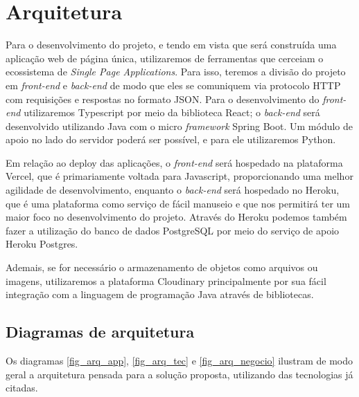 \section{Arquitetura}
Para o desenvolvimento do projeto, e tendo em vista que será construída uma aplicação web de página única, utilizaremos de ferramentas que cerceiam o ecossistema de \textit{Single Page Applications}. Para isso, teremos a divisão do projeto em \textit{front-end} e \textit{back-end} de modo que eles se comuniquem via protocolo HTTP com requisições e respostas no formato JSON. Para o desenvolvimento do \textit{front-end} utilizaremos Typescript por meio da biblioteca React; o \textit{back-end} será desenvolvido utilizando Java com o micro \textit{framework} Spring Boot. Um módulo de apoio no lado do servidor poderá ser possível, e para ele utilizaremos Python. 

Em relação ao deploy das aplicações, o \textit{front-end} será hospedado na plataforma Vercel, que é primariamente voltada para Javascript, proporcionando uma melhor agilidade de desenvolvimento, enquanto o \textit{back-end} será hospedado no Heroku, que é uma plataforma como serviço de fácil manuseio e que nos permitirá ter um maior foco no desenvolvimento do projeto. Através do Heroku podemos também fazer a utilização do banco de dados PostgreSQL por meio do serviço de apoio Heroku Postgres.

Ademais, se for necessário o armazenamento de objetos como arquivos ou imagens, utilizaremos a plataforma Cloudinary principalmente por sua fácil integração com a linguagem de programação Java através de bibliotecas.

\subsection{Diagramas de arquitetura}
Os diagramas \autoref{fig_arq_app}, \autoref{fig_arq_tec} e \autoref{fig_arq_negocio} ilustram de modo geral a arquitetura pensada para a solução proposta, utilizando das tecnologias já citadas.

